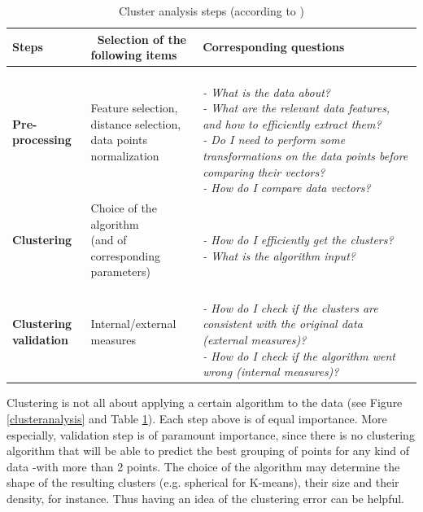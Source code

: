 \documentclass{report}
\begin{document}
\begin{table}[H]
\centering
\begin{tabular}{| l | l | l |}
\hline
\parbox[c]{5cm}{\textbf{Steps}} & \
\parbox[c]{5cm}{\textbf{Selection of the\\ following items}} & 
\parbox[c]{5cm}{\textbf{Corresponding questions}}\\
\hline
\parbox[c]{5cm}{\textbf{Pre-processing}} & 
\parbox[c]{5cm}{Feature selection,\\distance selection,\\data points normalization} & 
\parbox[c]{5cm}{\textit{~\\- What is the data about?\\- What are the relevant data features, and how to efficiently extract them?\\- Do I need to perform some transformations on the data points before comparing their vectors?\\- How do I compare data vectors?\newline}}\\
\hline
\parbox[c]{5cm}{\textbf{Clustering}} & 
\parbox[c]{5cm}{Choice of the algorithm \\(and of corresponding\\ parameters)} & 
\parbox[c]{5cm}{\textit{~\\- How do I efficiently get the clusters?\\- What is the algorithm input?\newline}}\\
\hline
\parbox[c]{5cm}{\textbf{Clustering\\validation}} & 
\parbox[c]{5cm}{Internal/external measures} & 
\parbox[c]{5cm}{\textit{~\\- How do I check if the clusters are consistent with the original data (external measures)?\\- How do I check if the algorithm went wrong (internal measures)?\newline}} \\
\hline
\end{tabular}
\caption{Cluster analysis steps (according to \cite{handl2005computational})}
\label{clustersteps}
\end{table}

Clustering is not all about applying a certain algorithm to the data (see Figure \ref{clusteranalysis} and Table \ref{clustersteps}). Each step above is of equal importance. More especially, validation step is of paramount importance, since there is no clustering algorithm that will be able to predict the best grouping of points for any kind of data -with more than 2 points\cite{kleinberg2002impossibility}. The choice of the algorithm may determine the shape of the resulting clusters (e.g. spherical for K-means), their size and their density, for instance. Thus having an idea of the clustering error can be helpful.\\
\end{document}
